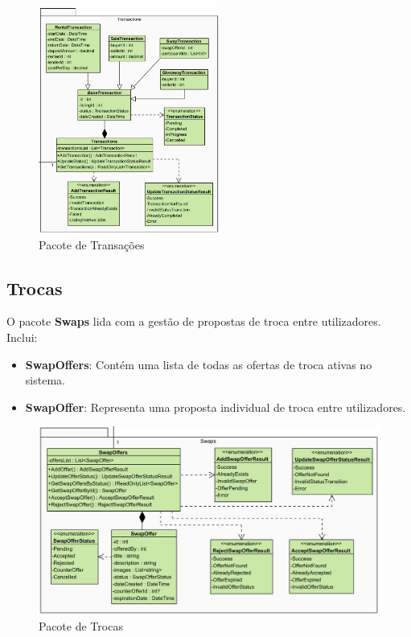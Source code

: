 \documentclass[a4paper, 12pt]{article} %
\begin{document}
\begin{figure}[ht]
	\centering
	\includegraphics[width=0.53\textwidth]{diagrama_classes_transacoes.png}
	\caption{Pacote de Transações}
	\label{fig:diagrama_classes_transacoes}
\end{figure}

\subsection{Trocas}

O pacote \textbf{Swaps} lida com a gestão de propostas de troca entre utilizadores. Inclui:

\begin{itemize} 
	\item \textbf{SwapOffers}: Contém uma lista de todas as ofertas de troca ativas no sistema. 
	\item \textbf{SwapOffer}: Representa uma proposta individual de troca entre utilizadores.
\end{itemize}

\begin{figure}[ht]
	\centering
	\includegraphics[width=\textwidth]{diagrama_classes_trocas.png}
	\caption{Pacote de Trocas}
	\label{fig:w}
\end{figure}
\end{document}
